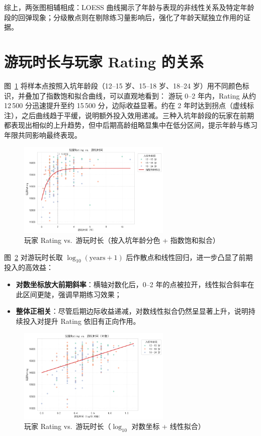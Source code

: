 \documentclass[12pt]{article}
\begin{document}
\noindent 综上，两张图相辅相成：LOESS 曲线揭示了年龄与表现的非线性关系及特定年龄段的回弹现象；分级散点则在剔除练习量影响后，强化了年龄天赋独立作用的证据。


\newpage

\section{游玩时长与玩家 Rating 的关系}

图~\ref{fig:playtime_saturate} 将样本点按照入坑年龄段（12–15 岁、15–18 岁、18–24 岁）用不同颜色标识，并叠加了指数饱和拟合曲线，可以直观地看到：  游玩 0–2 年内，Rating 从约 12\,500 分迅速提升至约 15\,500 分，边际收益显著。约在 2 年时达到拐点（虚线标注），之后曲线趋于平缓，说明额外投入效用递减。三种入坑年龄段的玩家在前期都表现出相似的上升趋势，但中后期高龄组略显集中在低分区间，提示年龄与练习年限共同影响最终表现。  


\begin{figure}[htbp]
	\centering
	\includegraphics[width=0.65\textwidth]{fig4.png}
	\caption{玩家 Rating vs.\ 游玩时长（按入坑年龄分色 + 指数饱和拟合）}
	\label{fig:playtime_saturate}
\end{figure}

图~\ref{fig:playtime_log} 对游玩时长取 $\log_{10}(\mathrm{years}+1)$ 后作散点和线性回归，进一步凸显了前期投入的高效益：  
\begin{itemize}
	\item \textbf{对数坐标放大前期斜率}：横轴对数化后，0–2 年的点被拉开，线性拟合斜率在此区间更陡，强调早期练习效果；  
	\item \textbf{整体正相关}：尽管后期边际收益递减，对数线性拟合仍然呈显著上升，说明持续投入对提升 Rating 依旧有正向作用。  
\end{itemize}

\begin{figure}[htbp]
	\centering
	\includegraphics[width=0.65\textwidth]{fig5.png}
	\caption{玩家 Rating vs.\ 游玩时长（$\log_{10}$ 对数坐标 + 线性拟合）}
	\label{fig:playtime_log}
\end{figure}
\end{document}
